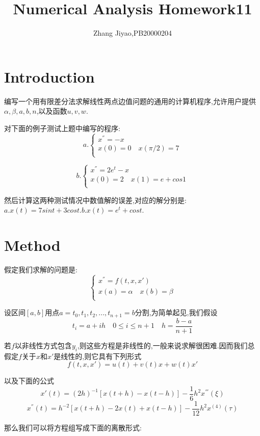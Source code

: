 \documentclass{article}
\title{Numerical Analysis Homework11}
\author{Zhang Jiyao,PB20000204}
\begin{document}
	\maketitle
	
	\section{Introduction}
	
	编写一个用有限差分法求解线性两点边值问题的通用的计算机程序,允许用户提供$\alpha,\beta,a,b,n$,以及函数$u,v,w$.
	
	对下面的例子测试上题中编写的程序:
	$$	
	a.\left\{ 
	\begin{array}{lc}
		x^{''} = -x \\
		x(0) = 0  \quad x(\pi/2)=7\\
	\end{array}
	\right.$$
	
	$$	
	b.\left\{ 
	\begin{array}{lc}
		x^{''} = 2e^t-x \\
		x(0) = 2  \quad x(1)=e+cos1\\
	\end{array}
	\right.$$
	
 然后计算这两种测试情况中数值解的误差,对应的解分别是:$a.x(t)=\text{7}sint+\text{3}cost.$\quad $b.x(t)=e^t+cost$.
	
	
	\section{Method}
	假定我们求解的问题是:
	$$	
	\left\{ 
	\begin{array}{lc}
		x^{''} = f(t,x,x') \\
		x(a) = \alpha  \quad x(b)=\beta \\
	\end{array}
	\right.$$

    设区间$[a,b]$用点$a=t_0,t_1,t_2,...,t_{n+1}=b$分割,为简单起见,我们假设
    $$ t_i=a+ih \quad 0 \leq i \leq n+1 \quad h=\frac{b-a}{n+1}$$
    
    若$f$以非线性方式包含$y_i$,则这些方程是非线性的,一般来说求解很困难.因而我们总假定$f$关于$x$和$x'$是线性的,则它具有下列形式
              $$   f(t,x,x')=u(t)+v(t)x+w(t)x' $$
              
    以及下面的公式
    $$   x'(t)=(2h)^{-1}[x(t+h)-x(t-h)]-\frac{1}{6}h^2x^{'''}(\xi) $$
    $$   x^{''}(t)=h^{-2}[x(t+h)-2x(t)+x(t-h)]-\frac{1}{12}h^2x^{(4)}(\tau) $$
	
	那么我们可以将方程组写成下面的离散形式:
	
\end{document}
